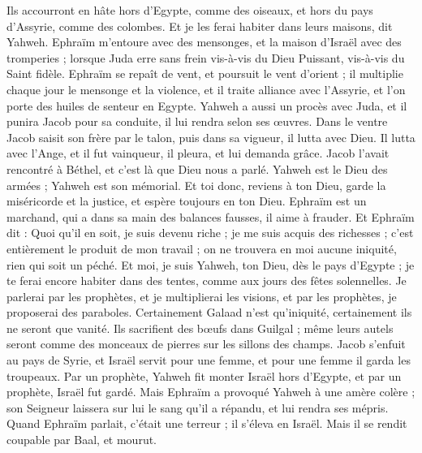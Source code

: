 \begin{multicols}{2}
Ils accourront en hâte hors d'Egypte, comme des oiseaux, et hors du pays d'Assyrie, comme des colombes. Et je les ferai habiter dans leurs maisons, dit Yahweh.
\VerseOne{}Ephraïm m'entoure avec des mensonges, et la maison d'Israël avec des tromperies ; lorsque Juda erre sans frein vis-à-vis du Dieu Puissant, vis-à-vis du Saint fidèle.
Ephraïm se repaît de vent, et poursuit le vent d'orient ; il multiplie chaque jour le mensonge et la violence, et il traite alliance avec l'Assyrie, et l'on porte des huiles de senteur en Egypte.
Yahweh a aussi un procès avec Juda, et il punira Jacob pour sa conduite, il lui rendra selon ses œuvres.
Dans le ventre Jacob saisit son frère par le talon, puis dans sa vigueur, il lutta avec Dieu.
Il lutta avec l'Ange, et il fut vainqueur, il pleura, et lui demanda grâce. Jacob l'avait rencontré à Béthel, et c'est là que Dieu nous a parlé.
Yahweh est le Dieu des armées ; Yahweh est son mémorial.
Et toi donc, reviens à ton Dieu, garde la miséricorde et la justice, et espère toujours en ton Dieu.
Ephraïm est un marchand, qui a dans sa main des balances fausses, il aime à frauder.
Et Ephraïm dit : Quoi qu'il en soit, je suis devenu riche ; je me suis acquis des richesses ; c'est entièrement le produit de mon travail ; on ne trouvera en moi aucune iniquité, rien qui soit un péché.
Et moi, je suis Yahweh, ton Dieu, dès le pays d'Egypte ; je te ferai encore habiter dans des tentes, comme aux jours des fêtes solennelles.
Je parlerai par les prophètes, et je multiplierai les visions, et par les prophètes, je proposerai des paraboles.
Certainement Galaad n'est qu'iniquité, certainement ils ne seront que vanité. Ils sacrifient des bœufs dans Guilgal ; même leurs autels seront comme des monceaux de pierres sur les sillons des champs.
Jacob s'enfuit au pays de Syrie, et Israël servit pour une femme, et pour une femme il garda les troupeaux.
Par un prophète, Yahweh fit monter Israël hors d'Egypte, et par un prophète, Israël fut gardé.
Mais Ephraïm a provoqué Yahweh à une amère colère ; son Seigneur laissera sur lui le sang qu'il a répandu, et lui rendra ses mépris.
\VerseOne{}Quand Ephraïm parlait, c'était une terreur ; il s'éleva en Israël. Mais il se rendit coupable par Baal, et mourut.

\end{multicols}
